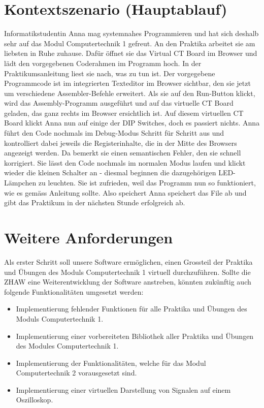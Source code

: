 \documentclass[10pt]{article}
\begin{document}
\section{Kontextszenario (Hauptablauf)}

Informatikstudentin Anna mag systemnahes Programmieren und hat sich deshalb sehr auf das Modul \glqq Computertechnik 1\grqq{} gefreut. An den Praktika arbeitet sie am liebsten in Ruhe zuhause. Dafür öffnet sie das \glqq Virtual CT Board\grqq{} im Browser und lädt den vorgegebenen Coderahmen im Programm hoch. In der Praktikumsanleitung liest sie nach, was zu tun ist. Der vorgegebene Programmcode ist im integrierten Texteditor im Browser sichtbar, den sie jetzt um verschiedene Assembler-Befehle erweitert. Als sie auf den \glqq Run\grqq-Button klickt, wird das Assembly-Programm ausgeführt und auf das virtuelle CT Board \glqq geladen\grqq, das ganz rechts im Browser ersichtlich ist. 
\newline Auf diesem virtuellen CT Board klickt Anna nun auf einige der DIP Switches, doch es passiert nichts. Anna führt den Code nochmals im Debug-Modus Schritt für Schritt aus und kontrolliert dabei jeweils die Registerinhalte, die in der Mitte des Browsers angezeigt werden. Da bemerkt sie einen semantischen Fehler, den sie schnell korrigiert. Sie lässt den Code nochmals im normalen Modus laufen und klickt wieder die kleinen Schalter an - diesmal beginnen die dazugehörigen LED-Lämpchen zu leuchten. Sie ist zufrieden, weil das Programm nun so funktioniert, wie es gemäss Anleitung sollte. Also speichert Anna speichert das File ab und gibt das Praktikum in der nächsten Stunde erfolgreich ab.

\section{Weitere Anforderungen}
Als erster Schritt soll unsere Software ermöglichen, einen Grossteil der Praktika und Übungen des Moduls \glqq Computertechnik 1\grqq{} virtuell durchzuführen. Sollte die ZHAW eine Weiterentwicklung der Software anstreben, könnten zukünftig auch folgende Funktionalitäten umgesetzt werden: 
\begin{itemize}
\item Implementierung fehlender Funktionen für alle Praktika und Übungen des Moduls \glqq Computertechnik 1\grqq. 
\item Implementierung einer vorbereiteten Bibliothek aller Praktika und Übungen des Modules \glqq Computertechnik 1\grqq. 
\item Implementierung der Funktionalitäten, welche für das Modul \glqq Computertechnik 2\grqq{} vorausgesetzt sind. 
\item Implementierung einer virtuellen Darstellung von Signalen auf einem Oszilloskop.
\end{itemize}
\end{document}
